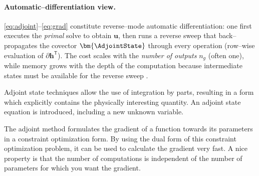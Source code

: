 \paragraph{Automatic–differentiation view.}

\eqref{eq:adjoint}–\eqref{eq:grad} constitute reverse–mode
automatic differentiation: one first executes the \emph{primal} solve to
obtain $\bm{u}$, then runs a reverse sweep that back–propagates the covector
$\bm{\AdjointState}$ through every operation (row–wise evaluation of
$\partial\bm{h}^\mathsf{T}$).  
The cost scales with the
\emph{number of outputs} $n_g$ (often one),
while memory grows with the depth of the computation because intermediate
states must be available for the reverse sweep \cite{MITAD2023}.


Adjoint state techniques allow the use of integration by parts, resulting in a form
which explicitly contains the physically interesting quantity. 
An adjoint state equation is introduced, including a new unknown variable.

The adjoint method formulates the gradient of a function towards its
parameters in a constraint optimization form. 
By using the dual form of
this constraint optimization problem, it can be used to calculate the
gradient very fast. 
A nice property is that the number of computations
is independent of the number of parameters for which you want the gradient. 








